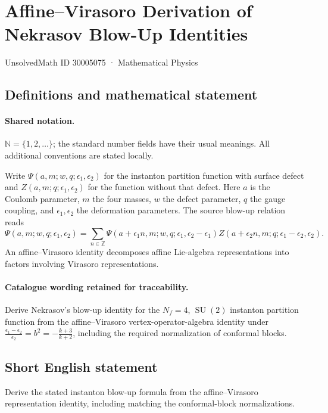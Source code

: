 \documentclass[11pt]{article}
\begin{document}
\setcounter{section}{30005074}
\section{Affine–Virasoro Derivation of Nekrasov Blow-Up Identities}\label{30005075}
{\small UnsolvedMath ID 30005075 · Mathematical Physics}
\subsection{Definitions and mathematical statement}

\paragraph{Shared notation.}$\mathbb N=\{1,2,\ldots\}$; the standard number fields have their usual meanings. All additional conventions are stated locally.


Write $\Psi(a,m;w,q;\epsilon_1,\epsilon_2)$ for the instanton partition function with surface defect and $Z(a,m;q;\epsilon_1,\epsilon_2)$ for the function without that defect. Here $a$ is the Coulomb parameter, $m$ the four masses, $w$ the defect parameter, $q$ the gauge coupling, and $\epsilon_1,\epsilon_2$ the deformation parameters. The source blow-up relation reads
\[
\Psi(a,m;w,q;\epsilon_1,\epsilon_2)=\sum_{n\in\mathbb Z}
\Psi(a+\epsilon_1n,m;w,q;\epsilon_1,\epsilon_2-\epsilon_1)
Z(a+\epsilon_2n,m;q;\epsilon_1-\epsilon_2,\epsilon_2).
\]
An affine--Virasoro identity decomposes affine Lie-algebra representations into factors involving Virasoro representations.

\paragraph{Catalogue wording retained for traceability.}
Derive Nekrasov's blow-up identity for the $N_f=4$, $\operatorname{SU}(2)$ instanton partition function from the affine–Virasoro vertex-operator-algebra identity under $\frac{\epsilon_1-\epsilon_2}{\epsilon_2}=b^2=-\frac{k+3}{k+2}$, including the required normalization of conformal blocks.
\subsection{Short English statement}
Derive the stated instanton blow-up formula from the affine--Virasoro representation identity, including matching the conformal-block normalizations.
\end{document}
